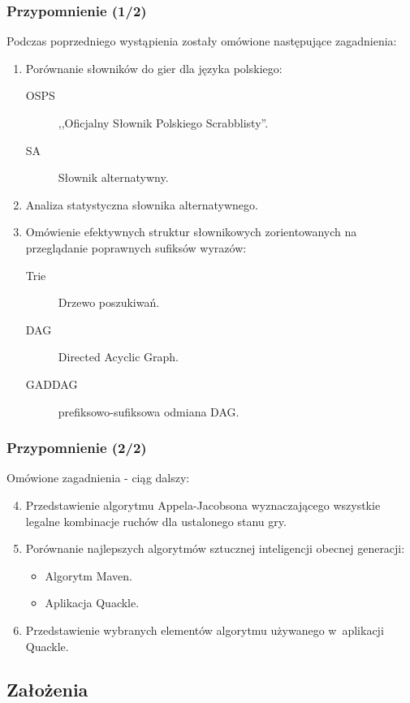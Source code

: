\documentclass[10pt,a4paper]{beamer}
\begin{document}
\begin{frame}
	\frametitle{Przypomnienie (1/2)}

	Podczas poprzedniego wystąpienia zostały omówione następujące zagadnienia:

	\begin{enumerate}
		\item Porównanie słowników do gier dla języka polskiego:
			\begin{description}
				\item[OSPS] ,,Oficjalny Słownik Polskiego Scrabblisty''.
				\item[SA] Słownik alternatywny.
			\end{description}
		\item Analiza statystyczna słownika alternatywnego.
		\item Omówienie efektywnych struktur słownikowych zorientowanych na przeglądanie poprawnych sufiksów wyrazów:
			\begin{description}
				\item[Trie] Drzewo poszukiwań.
				\item[DAG] Directed Acyclic Graph.
				\item[GADDAG] prefiksowo-sufiksowa odmiana DAG.
			\end{description}
	\end{enumerate}
\end{frame}

\begin{frame}
	\frametitle{Przypomnienie (2/2)}

	Omówione zagadnienia - ciąg dalszy:

	\begin{enumerate}
		\setcounter{enumi}{3}
		\item Przedstawienie algorytmu Appela-Jacobsona wyznaczającego wszystkie legalne kombinacje ruchów dla ustalonego stanu gry.
		\item Porównanie najlepszych algorytmów sztucznej inteligencji obecnej generacji:
			\begin{itemize}
				\item Algorytm Maven.
				\item Aplikacja Quackle.
			\end{itemize}
		\item Przedstawienie wybranych elementów algorytmu używanego w~aplikacji Quackle.
	\end{enumerate}
\end{frame}

\subsection{Założenia}
\end{document}

